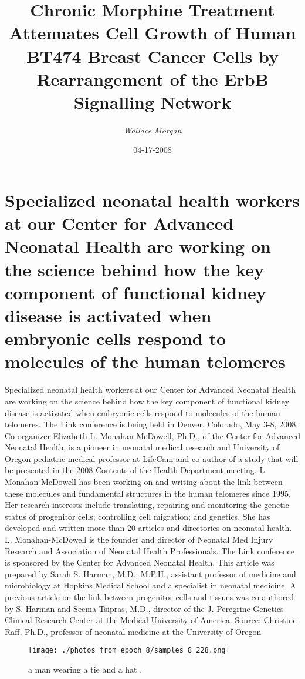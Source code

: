 \documentclass{article}%
\title{Chronic Morphine Treatment Attenuates Cell Growth of Human BT474 Breast Cancer Cells by Rearrangement of the ErbB Signalling Network}%
\author{\textit{Wallace Morgan}}%
\date{04-17-2008}%
\begin{document}
%
\normalsize%
\maketitle%
\section{Specialized neonatal health workers at our Center for Advanced Neonatal Health are working on the science behind how the key component of functional kidney disease is activated when embryonic cells respond to molecules of the human telomeres}%
\label{sec:SpecializedneonatalhealthworkersatourCenterforAdvancedNeonatalHealthareworkingonthesciencebehindhowthekeycomponentoffunctionalkidneydiseaseisactivatedwhenembryoniccellsrespondtomoleculesofthehumantelomeres}%
Specialized neonatal health workers at our Center for Advanced Neonatal Health are working on the science behind how the key component of functional kidney disease is activated when embryonic cells respond to molecules of the human telomeres.\newline%
The Link conference is being held in Denver, Colorado, May 3{-}8, 2008.\newline%
Co{-}organizer Elizabeth L. Monahan{-}McDowell, Ph.D., of the Center for Advanced Neonatal Health, is a pioneer in neonatal medical research and University of Oregon pediatric medical professor at LifeCam and co{-}author of a study that will be presented in the 2008 Contents of the Health Department meeting. L. Monahan{-}McDowell has been working on and writing about the link between these molecules and fundamental structures in the human telomeres since 1995. Her research interests include translating, repairing and monitoring the genetic status of progenitor cells; controlling cell migration; and genetics. She has developed and written more than 20 articles and directories on neonatal health. L. Monahan{-}McDowell is the founder and director of Neonatal Med Injury Research and Association of Neonatal Health Professionals.\newline%
The Link conference is sponsored by the Center for Advanced Neonatal Health.\newline%
This article was prepared by Sarah S. Harman, M.D., M.P.H., assistant professor of medicine and microbiology at Hopkins Medical School and a specialist in neonatal medicine. A previous article on the link between progenitor cells and tissues was co{-}authored by S. Harman and Seema Tsipras, M.D., director of the J. Peregrine Genetics Clinical Research Center at the Medical University of America.\newline%
Source:\newline%
Christine Raff, Ph.D., professor of neonatal medicine at the University of Oregon\newline%

%


\begin{figure}[h!]%
\centering%
\texttt{[image: ./photos\_from\_epoch\_8/samples\_8\_228.png]}%
\caption{a man wearing a tie and a hat .}%
\end{figure}

%
\end{document}
